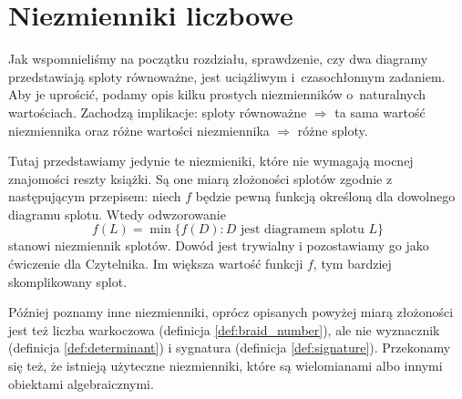 \section{Niezmienniki liczbowe}
Jak wspomnieliśmy na początku rozdziału, sprawdzenie,
czy dwa diagramy przedstawiają sploty równoważne,
jest uciążliwym i~czasochłonnym zadaniem.
Aby je uprościć, podamy opis kilku prostych niezmienników o~naturalnych wartościach.
Zachodzą implikacje:
sploty równoważne $\Rightarrow$ ta sama wartość niezmiennika
oraz różne wartości niezmiennika $\Rightarrow$ różne sploty.

Tutaj przedstawiamy jedynie te niezmieniki, które nie wymagają mocnej znajomości reszty książki.
Są one miarą złożoności splotów zgodnie z następującym przepisem: niech $f$ będzie pewną funkcją określoną dla dowolnego diagramu splotu.
Wtedy odwzorowanie
\begin{equation}
    f(L) = \min \{f(D) : D \text{ jest diagramem splotu } L\}
\end{equation}
stanowi niezmiennik splotów.
Dowód jest trywialny i pozostawiamy go jako ćwiczenie dla Czytelnika.
Im większa wartość funkcji $f$, tym bardziej skomplikowany splot.

Później poznamy inne niezmienniki, oprócz opisanych powyżej miarą złożoności jest też liczba warkoczowa (definicja \ref{def:braid_number}), ale nie wyznacznik (definicja \ref{def:determinant}) i sygnatura (definicja \ref{def:signature}).
Przekonamy się też, że istnieją użyteczne niezmienniki, które są wielomianami albo innymi obiektami algebraicznymi.
















